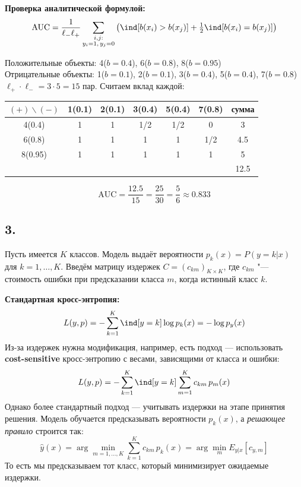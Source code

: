 \documentclass[12pt,a4paper]{article}
\begin{document}
\textbf{Проверка аналитической формулой:}
\[
\text{AUC} = \frac{1}{\ell_-\ell_+}\sum_{\substack{i,j:\\y_i=1,\,y_j=0}}
\left(\ind[b(x_i)>b(x_j)] + \tfrac{1}{2}\ind[b(x_i)=b(x_j)]\right)
\]

Положительные объекты: 4($b=0.4$), 6($b=0.8$), 8($b=0.95$)\\[1mm]
Отрицательные объекты: 1($b=0.1$), 2($b=0.1$), 3($b=0.4$),
5($b=0.4$), 7($b=0.8$)\\[1mm]

$\ell_+\cdot\ell_- = 3\cdot 5 = 15$ пар. Считаем вклад каждой:

\begin{center}
\begin{tabular}{c|ccccc|c}
$(+)\backslash(-)$ & 1(0.1) & 2(0.1) & 3(0.4) & 5(0.4) & 7(0.8) & сумма\\
\midrule
4(0.4) & 1 & 1 & 1/2 & 1/2 & 0 & 3\\
6(0.8) & 1 & 1 & 1 & 1 & 1/2 & 4.5\\
8(0.95) & 1 & 1 & 1 & 1 & 1 & 5\\
\midrule
& & & & & & 12.5
\end{tabular}
\end{center}

\[
\text{AUC} = \frac{12.5}{15} = \frac{25}{30}
= \frac{5}{6} \approx 0.833
\]

\subsection*{3.}

Пусть имеется $K$ классов. Модель выдаёт вероятности
$p_k(x) = P(y=k|x)$ для $k=1,\ldots,K$.
Введём матрицу издержек $C = (c_{km})_{K\times K}$, где $c_{km}$ "---
стоимость ошибки при предсказании класса $m$, когда истинный класс $k$.

\textbf{Стандартная кросс-энтропия:}
\[
L(y, p) = -\sum_{k=1}^{K} \ind[y=k]\log p_k(x)
= -\log p_y(x)
\]
Из-за издержек нужна модификация, например, есть подход --- использовать \textbf{cost-sensitive}
кросс-энтропию с весами, зависящими от класса и ошибки:
\[
L(y, p) = -\sum_{k=1}^{K} \ind[y=k] \sum_{m=1}^{K} c_{km}\, p_m(x)
\]
Однако более стандартный подход --- учитывать издержки на этапе
принятия решения. Модель обучается предсказывать вероятности
$p_k(x)$, а \emph{решающее правило} строится так:
\[
\hat{y}(x) = \arg\min_{m=1,\ldots,K}
\sum_{k=1}^{K} c_{km}\, p_k(x) = \arg\min_m E_{y|x}[c_{y,m}]
\]
То есть мы предсказываем тот класс, который минимизирует ожидаемые
издержки.
\end{document}
